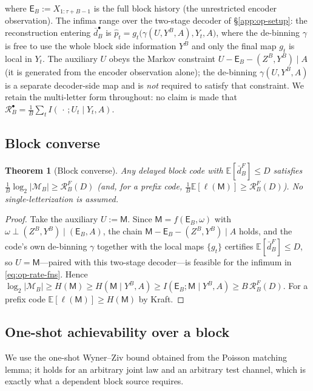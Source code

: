 \documentclass[11pt]{article}
\newcommand{\E}{\mathbb{E}}
\newcommand{\phat}{\hat{p}}
\theoremstyle{plain}
\newtheorem{theorem}{Theorem}[section]
\theoremstyle{definition}
\theoremstyle{remark}
\begin{document}
where $\mathsf E_B:=X_{1:\tau+B-1}$ is the full block history (the
unrestricted encoder observation). The infima range over the
two-stage decoder of \S\ref{app:op-setup}: the reconstruction entering
$\bar d_B^\bullet$ is $\phat_t=g_t\bigl(\gamma(U,Y^B,A),Y_t,A\bigr)$,
where the de-binning $\gamma$ is free to use the whole block side
information $Y^B$ and only the final map $g_t$ is local in $Y_t$. The
auxiliary $U$ obeys the Markov constraint $U-\mathsf E_B-(Z^B,Y^B)\mid A$
(it is generated from the encoder observation alone); the de-binning
$\gamma(U,Y^B,A)$ is a separate decoder-side map and is \emph{not}
required to satisfy that constraint. We retain the multi-letter form
throughout: no claim is made that
$\mathcal R^{\bullet}_B=\tfrac1B\sum_t I(\,\cdot\,;U_t\mid Y_t,A)$.

\subsection{Block converse}
\label{app:op-converse}

\begin{theorem}[Block converse]
\label{thm:op-converse}
Any delayed block code with $\E[\bar d_B^F]\le D$ satisfies
$\tfrac1B\log_2|\mathcal M_B|\ge \mathcal R^F_B(D)$ (and, for a prefix
code, $\tfrac1B\E[\ell(\mathsf M)]\ge\mathcal R^F_B(D)$). No
single-letterization is assumed.
\end{theorem}
\begin{proof}
Take the auxiliary $U:=\mathsf M$. Since $\mathsf
M=f(\mathsf E_B,\omega)$ with $\omega\perp(Z^B,Y^B)\mid(\mathsf E_B,A)$,
the chain $\mathsf M-\mathsf E_B-(Z^B,Y^B)\mid A$ holds, and the code's
own de-binning $\gamma$ together with the local maps $\{g_t\}$
certifies $\E[\bar d_B^F]\le D$, so $U=\mathsf M$---paired with this
two-stage decoder---is feasible for the infimum in
\eqref{eq:op-rate-fns}. Hence
$\log_2|\mathcal M_B|\ge H(\mathsf M)\ge H(\mathsf M\mid Y^B,A)\ge
I(\mathsf E_B;\mathsf M\mid Y^B,A)\ge B\,\mathcal R^F_B(D)$. For a
prefix code $\E[\ell(\mathsf M)]\ge H(\mathsf M)$ by Kraft.
\end{proof}

\subsection{One-shot achievability over a block}
\label{app:op-ach}

We use the one-shot Wyner--Ziv bound obtained from the Poisson
matching lemma; it holds for an arbitrary joint law and an arbitrary
test channel, which is exactly what a dependent block source
requires.
\end{document}
